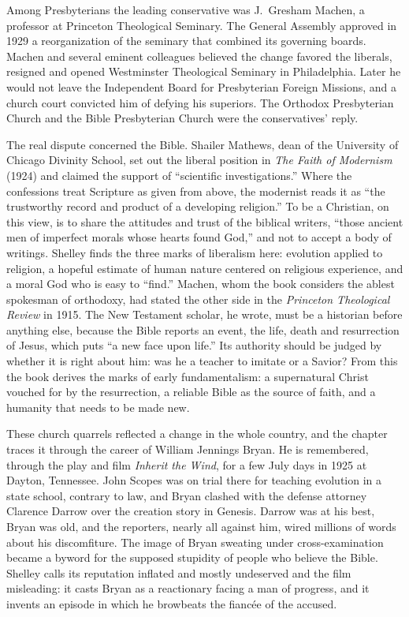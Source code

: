 Among Presbyterians the leading conservative was J.~Gresham Machen, a professor at Princeton Theological Seminary. The General Assembly approved in 1929 a reorganization of the seminary that combined its governing
boards. Machen and several eminent colleagues believed the change favored the liberals, resigned and
opened Westminster Theological Seminary in Philadelphia. Later he would not leave the Independent
Board for Presbyterian Foreign Missions, and a church court convicted him of defying his superiors.
The Orthodox Presbyterian Church and the Bible Presbyterian Church were the conservatives' reply.

The real dispute concerned the Bible. Shailer Mathews, dean of the University of Chicago Divinity
School, set out the liberal position in \emph{The Faith of Modernism} (1924) and claimed the support
of ``scientific investigations.'' Where the confessions treat Scripture as given from above, the
modernist reads it as ``the trustworthy record and product of a developing religion.'' To be a
Christian, on this view, is to share the attitudes and trust of the biblical writers, ``those ancient
men of imperfect morals whose hearts found God,'' and not to accept a body of writings. Shelley finds
the three marks of liberalism here: evolution applied to religion, a hopeful estimate of human nature
centered on religious experience, and a moral God who is easy to ``find.'' Machen, whom the book
considers the ablest spokesman of orthodoxy, had stated the other side in the \emph{Princeton
Theological Review} in 1915. The New Testament scholar, he wrote, must be a historian before anything
else, because the Bible reports an event, the life, death and resurrection of Jesus, which puts ``a
new face upon life.'' Its authority should be judged by whether it is right about him: was he a
teacher to imitate or a Savior? From this the book derives the marks of early fundamentalism: a
supernatural Christ vouched for by the resurrection, a reliable Bible as the source of faith, and a
humanity that needs to be made new.

These church quarrels reflected a change in the whole country, and the chapter traces it through the
career of William Jennings Bryan. He is remembered, through the play and film \emph{Inherit the
Wind}, for a few July days in 1925 at Dayton, Tennessee. John Scopes was on trial there for teaching
evolution in a state school, contrary to law, and Bryan clashed with the defense attorney Clarence
Darrow over the creation story in Genesis. Darrow was at his best, Bryan was old, and the reporters,
nearly all against him, wired millions of words about his discomfiture. The image of Bryan sweating
under cross-examination became a byword for the supposed stupidity of people who believe the Bible.
Shelley calls its reputation inflated and mostly undeserved and the film misleading: it casts Bryan
as a reactionary facing a man of progress, and it invents an episode in which he browbeats the
fianc\'ee of the accused.


